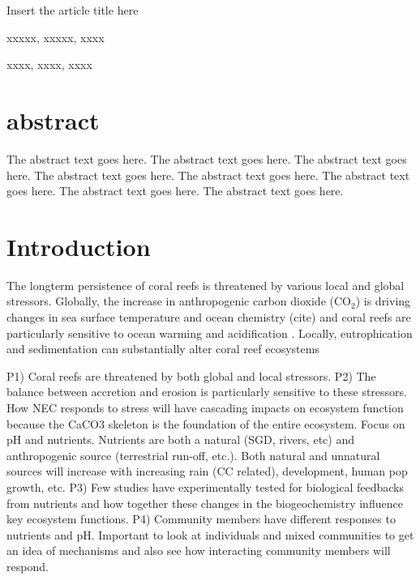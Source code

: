 \documentclass{article}%
\begin{document}
Insert the article title here




xxxxx, xxxxx, xxxx

xxxx, xxxx, xxxx


\linenumbers %
\section{abstract}
The abstract text goes here. The abstract text goes here. The abstract text goes here. The abstract text goes here.
The abstract text goes here. The abstract text goes here. The abstract text goes here. The abstract text goes here.




\section{Introduction}

The longterm persistence of coral reefs is threatened by various local and global stressors. Globally, the increase in anthropogenic carbon dioxide (CO$_2$) is driving changes in sea surface temperature and ocean chemistry (cite) and coral reefs are particularly sensitive to ocean warming and acidification \cite{Hoegh-Guldberg2007,pandolfi2011projecting}. Locally, eutrophication and sedimentation can substantially alter coral reef ecosystems \cite{fabricius2005effects}

P1) Coral reefs are threatened by both global and local stressors.
P2) The balance between accretion and erosion is particularly sensitive to these stressors. How NEC responds to stress will have cascading impacts on ecosystem function because the CaCO3 skeleton is the foundation of the entire ecosystem. Focus on pH and nutrients. Nutrients are both a natural (SGD, rivers, etc) and anthropogenic source (terrestrial run-off, etc.). Both natural and unnatural sources will increase with increasing rain (CC related), development, human pop growth, etc. 
P3) Few studies have experimentally tested for biological feedbacks from nutrients and how together these changes in the biogeochemistry influence key ecosystem functions.
P4) Community members have different responses to nutrients and pH. Important to look at individuals and mixed communities to get an idea of mechanisms and also see how interacting community members will respond.
\end{document}
